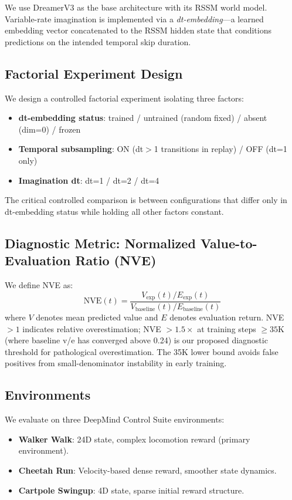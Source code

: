 \documentclass[10pt,letterpaper]{article}
\begin{document}
We use DreamerV3 as the base architecture with its RSSM world model. Variable-rate imagination is implemented via a \emph{dt-embedding}---a learned embedding vector concatenated to the RSSM hidden state that conditions predictions on the intended temporal skip duration.

\subsection{Factorial Experiment Design}

We design a controlled factorial experiment isolating three factors:
\begin{itemize}
    \item \textbf{dt-embedding status}: trained / untrained (random fixed) / absent (dim=0) / frozen
    \item \textbf{Temporal subsampling}: ON (dt$>$1 transitions in replay) / OFF (dt=1 only)
    \item \textbf{Imagination dt}: dt=1 / dt=2 / dt=4
\end{itemize}

The critical controlled comparison is between configurations that differ only in dt-embedding status while holding all other factors constant.

\subsection{Diagnostic Metric: Normalized Value-to-Evaluation Ratio (NVE)}

We define NVE as:
\begin{equation}
    \text{NVE}(t) = \frac{V_{\text{exp}}(t) / E_{\text{exp}}(t)}{V_{\text{baseline}}(t) / E_{\text{baseline}}(t)}
\end{equation}
where $V$ denotes mean predicted value and $E$ denotes evaluation return. NVE $> 1$ indicates relative overestimation; NVE $> 1.5\times$ at training steps $\geq 35$K (where baseline v/e has converged above 0.24) is our proposed diagnostic threshold for pathological overestimation. The 35K lower bound avoids false positives from small-denominator instability in early training.

\subsection{Environments}

We evaluate on three DeepMind Control Suite environments:
\begin{itemize}
    \item \textbf{Walker Walk}: 24D state, complex locomotion reward (primary environment).
    \item \textbf{Cheetah Run}: Velocity-based dense reward, smoother state dynamics.
    \item \textbf{Cartpole Swingup}: 4D state, sparse initial reward structure.
\end{itemize}
\end{document}
